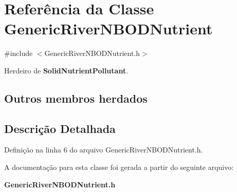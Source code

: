 \section{Referência da Classe Generic\+River\+N\+B\+O\+D\+Nutrient}
\label{class_generic_river_n_b_o_d_nutrient}


{\ttfamily \#include $<$Generic\+River\+N\+B\+O\+D\+Nutrient.\+h$>$}



Herdeiro de {\bf Solid\+Nutrient\+Pollutant}.

\subsection*{Outros membros herdados}


\subsection{Descrição Detalhada}


Definição na linha 6 do arquivo Generic\+River\+N\+B\+O\+D\+Nutrient.\+h.



A documentação para esta classe foi gerada a partir do seguinte arquivo\+:\begin{DoxyCompactItemize}
\item 
{\bf Generic\+River\+N\+B\+O\+D\+Nutrient.\+h}\end{DoxyCompactItemize}
